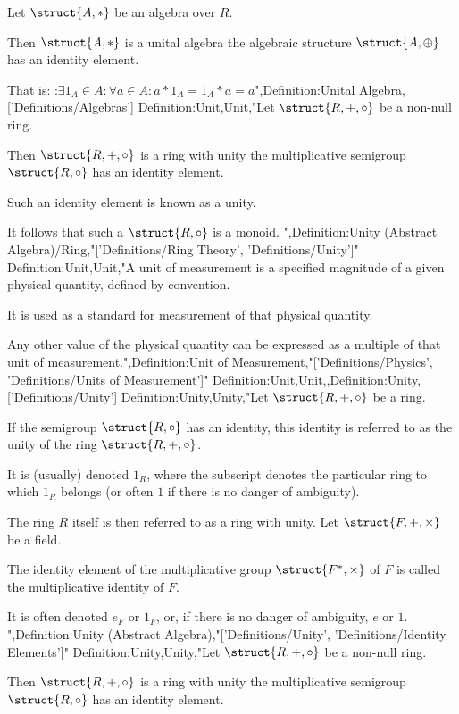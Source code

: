 Let $\struct {A, *}$ be an algebra over $R$. 


Then $\struct {A, *}$ is a unital algebra  the algebraic structure $\struct {A, \oplus}$ has an identity element.

That is:
:$\exists 1_A \in A: \forall a \in A: a * 1_A = 1_A * a = a$",Definition:Unital Algebra,['Definitions/Algebras']
Definition:Unit,Unit,"Let $\struct {R, +, \circ}$ be a non-null ring.

Then $\struct {R, +, \circ}$ is a ring with unity  the multiplicative semigroup $\struct {R, \circ}$ has an identity element.

Such an identity element is known as a unity.


It follows that such a $\struct {R, \circ}$ is a monoid.
",Definition:Unity (Abstract Algebra)/Ring,"['Definitions/Ring Theory', 'Definitions/Unity']"
Definition:Unit,Unit,"A unit of measurement is a specified magnitude of a given physical quantity, defined by convention.

It is used as a standard for measurement of that physical quantity.

Any other value of the physical quantity can be expressed as a multiple of that unit of measurement.",Definition:Unit of Measurement,"['Definitions/Physics', 'Definitions/Units of Measurement']"
Definition:Unit,Unit,,Definition:Unity,['Definitions/Unity']
Definition:Unity,Unity,"Let $\struct {R, +, \circ}$ be a ring.

If the semigroup $\struct {R, \circ}$ has an identity, this identity is referred to as the unity of the ring $\struct {R, +, \circ}$.

It is (usually) denoted $1_R$, where the subscript denotes the particular ring to which $1_R$ belongs (or often $1$ if there is no danger of ambiguity).


The ring $R$ itself is then referred to as a ring with unity.
Let $\struct {F, +, \times}$ be a field.

The identity element of the multiplicative group $\struct {F^*, \times}$ of $F$ is called the multiplicative identity of $F$.

It is often denoted $e_F$ or $1_F$, or, if there is no danger of ambiguity, $e$ or $1$.
",Definition:Unity (Abstract Algebra),"['Definitions/Unity', 'Definitions/Identity Elements']"
Definition:Unity,Unity,"Let $\struct {R, +, \circ}$ be a non-null ring.

Then $\struct {R, +, \circ}$ is a ring with unity  the multiplicative semigroup $\struct {R, \circ}$ has an identity element.

